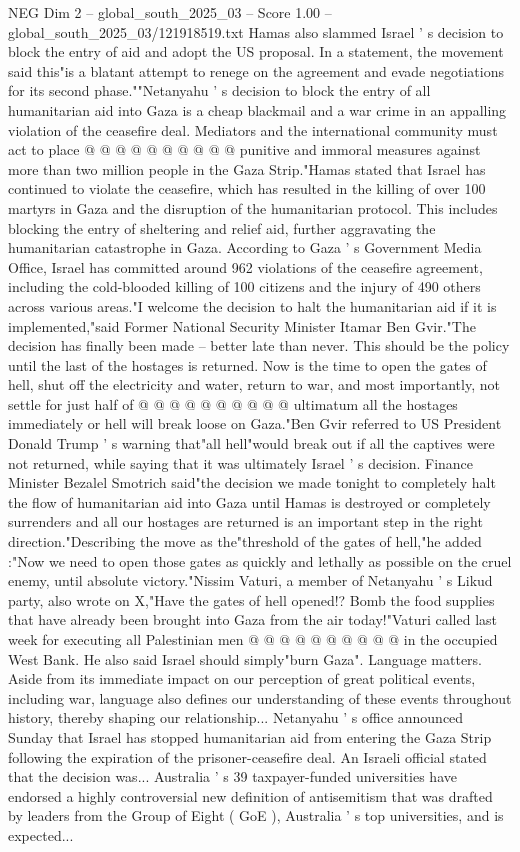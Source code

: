\begin{textsample}{NEG Dim 2 – global\_south\_2025\_03 – Score 1.00 – global\_south\_2025\_03/121918519.txt}
Hamas also slammed Israel ' s decision to block the entry of aid and adopt the US proposal.
In a statement, the movement said this"is a blatant attempt to renege on the agreement and evade negotiations for its second phase.""Netanyahu ' s decision to block the entry of all humanitarian aid into Gaza is a cheap blackmail and a war crime in an appalling violation of the ceasefire deal.
Mediators and the international community must act to place @ @ @ @ @ @ @ @ @ @ punitive and immoral measures against more than two million people in the Gaza Strip."Hamas stated that Israel has continued to violate the ceasefire, which has resulted in the killing of over 100 martyrs in Gaza and the disruption of the humanitarian protocol.
This includes blocking the entry of sheltering and relief aid, further aggravating the humanitarian catastrophe in Gaza.
According to Gaza ' s Government Media Office, Israel has committed around 962 violations of the ceasefire agreement, including the cold-blooded killing of 100 citizens and the injury of 490 others across various areas."I welcome the decision to halt the humanitarian aid if it is implemented,"said Former National Security Minister Itamar Ben Gvir."The decision has finally been made -- better late than never.
This should be the policy until the last of the hostages is returned.
Now is the time to open the gates of hell, shut off the electricity and water, return to war, and most importantly, not settle for just half of @ @ @ @ @ @ @ @ @ @ ultimatum all the hostages immediately or hell will break loose on Gaza."Ben Gvir referred to US President Donald Trump ' s warning that"all hell"would break out if all the captives were not returned, while saying that it was ultimately Israel ' s decision.
Finance Minister Bezalel Smotrich said"the decision we made tonight to completely halt the flow of humanitarian aid into Gaza until Hamas is destroyed or completely surrenders and all our hostages are returned is an important step in the right direction."Describing the move as the"threshold of the gates of hell,"he added :"Now we need to open those gates as quickly and lethally as possible on the cruel enemy, until absolute victory."Nissim Vaturi, a member of Netanyahu ' s Likud party, also wrote on X,"Have the gates of hell opened!?
Bomb the food supplies that have already been brought into Gaza from the air today!"Vaturi called last week for executing all Palestinian men @ @ @ @ @ @ @ @ @ @ in the occupied West Bank.
He also said Israel should simply"burn Gaza".
Language matters.
Aside from its immediate impact on our perception of great political events, including war, language also defines our understanding of these events throughout history, thereby shaping our relationship...
Netanyahu ' s office announced Sunday that Israel has stopped humanitarian aid from entering the Gaza Strip following the expiration of the prisoner-ceasefire deal.
An Israeli official stated that the decision was...
Australia ' s 39 taxpayer-funded universities have endorsed a highly controversial new definition of antisemitism that was drafted by leaders from the Group of Eight ( GoE ), Australia ' s top universities, and is expected...

\end{textsample}
